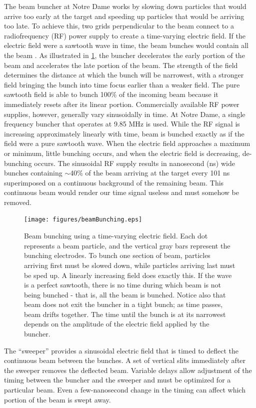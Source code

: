 The beam buncher at Notre Dame works by slowing down particles that would arrive too early at the target and speeding up particles that would be arriving too late.  To achieve this, two grids perpendicular to the beam connect to a radiofrequency (RF) power supply to create a time-varying electric field.  If the electric field were a sawtooth wave in time, the beam bunches would contain all the beam \cite{LynchBunching}.  As illustrated in \fig \ref{fig:bunching}, the buncher decelerates the early portion of the beam and accelerates the late portion of the beam.  The strength of the field determines the distance at which the bunch will be narrowest, with a stronger field bringing the bunch into time focus earlier than a weaker field.  The pure sawtooth field is able to bunch 100\% of the incoming beam because it immediately resets after its linear portion.  Commercially available RF power supplies, however, generally vary sinusoidally in time.  At Notre Dame, a single frequency buncher that operates at 9.85 MHz is used.  While the RF signal is increasing approximately linearly with time, beam is bunched exactly as if the field were a pure sawtooth wave.  When the electric field approaches a maximum or minimum, little bunching occurs, and when the electric field is decreasing, de-bunching occurs.  The sinusoidal RF supply results in nanosecond (ns) wide bunches containing $\sim$40\% of the beam arriving at the target every 101 ns superimposed on a continuous background of the remaining beam.  This continuous beam would render our time signal useless and must somehow be removed.

\begin{figure}[htp]
\centering
\texttt{[image: figures/beamBunching.eps]}
\label{fig:bunching}
\caption{Beam bunching using a time-varying electric field.  Each dot represents a beam particle, and the vertical gray bars represent the bunching electrodes.  To bunch one section of beam, particles arriving first must be slowed down, while particles arriving last must be sped up.  A linearly increasing field does exactly this.  If the wave is a perfect sawtooth, there is no time during which beam is not being bunched - that is, all the beam is bunched.  Notice also that beam does not exit the buncher in a tight bunch; as time passes, beam drifts together.  The time until the bunch is at its narrowest depends on the amplitude of the electric field applied by the buncher.}
\end{figure}

The ``sweeper'' provides a sinusoidal electric field that is timed to deflect the continuous beam between the bunches.  A set of vertical slits immediately after the sweeper removes the deflected beam.  Variable delays allow adjustment of the timing between the buncher and the sweeper and must be optimized for a particular beam.  Even a few-nanosecond change in the timing can affect which portion of the beam is swept away. 

